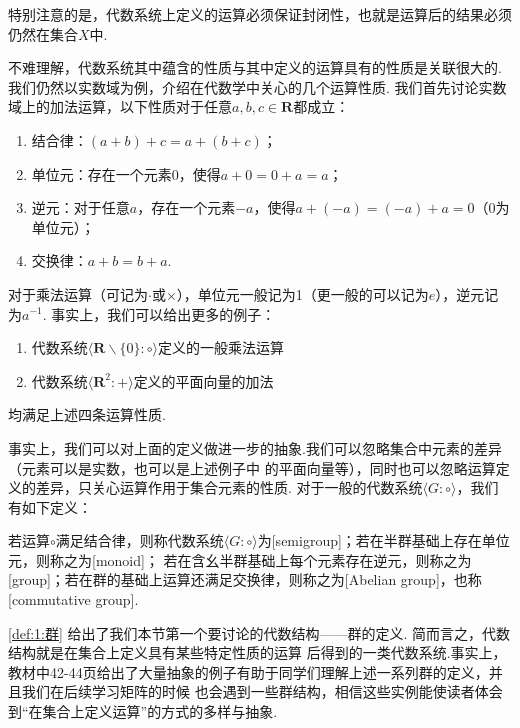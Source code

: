 特别注意的是，代数系统上定义的运算必须保证封闭性，也就是运算后的结果必须仍然在集合$X$中.

不难理解，代数系统其中蕴含的性质与其中定义的运算具有的性质是关联很大的.我们仍然以实数域为例，介绍在代数学中关心的几个运算性质.
我们首先讨论实数域上的加法运算，以下性质对于任意$a,b,c\in\mathbf{R}$都成立：

\begin{enumerate}
    \item 结合律：$(a+b)+c=a+(b+c)$；

    \item 单位元：存在一个元素0，使得$a+0=0+a=a$；

    \item 逆元：对于任意$a$，存在一个元素$-a$，使得$a+(-a)=(-a)+a=0$（0为单位元）；

    \item 交换律：$a+b=b+a$.
\end{enumerate}

对于乘法运算（可记为$\cdot$或$\times$），单位元一般记为1（更一般的可以记为$e$），逆元记为$a^{-1}$.
事实上，我们可以给出更多的例子：
\begin{example}\label{ex:1:Abel 群}
    \begin{enumerate}[label=(\arabic*)]
        \item 代数系统$\langle \mathbf{R}\backslash\{0\}:\circ\rangle$定义的一般乘法运算

        \item 代数系统$\langle \mathbf{R}^2:+\rangle$定义的平面向量的加法
    \end{enumerate}

    均满足上述四条运算性质.
\end{example}

事实上，我们可以对上面的定义做进一步的抽象.我们可以忽略集合中元素的差异（元素可以是实数，也可以是上述例子中
的平面向量等），同时也可以忽略运算定义的差异，只关心运算作用于集合元素的性质.
对于一般的代数系统$\langle G:\circ\rangle$，我们有如下定义：
\begin{definition} \label{def:1:群}
    若运算$\circ$满足结合律，则称代数系统$\langle G:\circ\rangle$为[semigroup]；若在半群基础上存在单位元，则称之为[monoid]；
    若在含幺半群基础上每个元素存在逆元，则称之为[group]；若在群的基础上运算还满足交换律，则称之为[Abelian group]，也称[commutative group].
\end{definition}

\autoref{def:1:群} 给出了我们本节第一个要讨论的代数结构——群的定义. 简而言之，代数结构就是在集合上定义具有某些特定性质的运算
后得到的一类代数系统.事实上，教材中42-44页给出了大量抽象的例子有助于同学们理解上述一系列群的定义，并且我们在后续学习矩阵的时候
也会遇到一些群结构，相信这些实例能使读者体会到``在集合上定义运算''的方式的多样与抽象.

